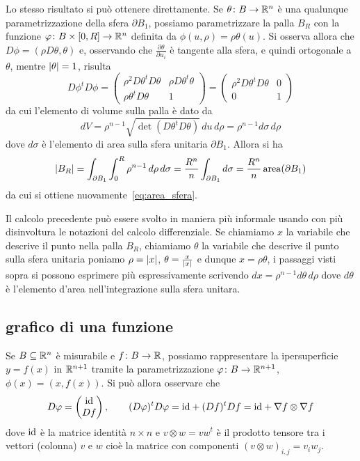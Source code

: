 Lo stesso risultato si può ottenere direttamente. 
Se $\theta\colon B\to {\mathbb R}^n$ è una qualunque parametrizzazione della sfera $\partial B_1$,
possiamo parametrizzare la palla $B_R$ con la funzione $\varphi \colon B\times [0,R] \to {\mathbb R}^n$ 
definita da $\phi(u,\rho) = \rho\theta(u)$.
Si osserva allora che $D\phi = (\rho D\theta, \theta)$ e, 
osservando che $\frac{\partial \theta}{\partial u_i}$ 
è tangente alla sfera, e quindi ortogonale a $\theta$, mentre ${\left|\theta\right|}=1$, 
risulta
\[
  D\phi^t D\phi = \begin{pmatrix}
  \rho^2 D\theta^t D\theta & \rho D\theta^t \theta \\
  \rho \theta^t D\theta & 1
  \end{pmatrix} = \begin{pmatrix}
  \rho^2 D\theta^t D\theta & 0 \\
  0 & 1
  \end{pmatrix}
\]
da cui l'elemento di volume sulla palla è dato da 
\[
  dV = \rho^{n-1} \sqrt{\det(D\theta^t D\theta)}\, du\, d\rho
     = \rho^{n-1} d\sigma\, d\rho
\]
dove $d\sigma$ è l'elemento di area sulla sfera unitaria $\partial B_1$.
Allora si ha
\[
{\left|B_R\right|} 
  = \int_{\partial B_1} \int_0^R \rho^{n-1}\, d\rho\, d\sigma 
  = \frac{R^n}{n} \int_{\partial B_1} d\sigma 
  = \frac{R^n}{n} \operatorname{area}(\partial B_1)
\]
da cui si ottiene nuovamente~\eqref{eq:area_sfera}.

Il calcolo precedente può essere svolto in maniera più 
informale usando con più disinvoltura le notazioni del calcolo 
differenziale. 
Se chiamiamo $x$ la variabile che descrive il punto nella palla $B_R$,
chiamiamo $\theta$ la variabile che descrive il punto sulla sfera unitaria
poniamo $\rho={\left|x\right|}$, $\theta = \frac{x}{{\left|x\right|}}$ e dunque $x = \rho \theta$,
i passaggi visti sopra si possono esprimere più espressivamente 
scrivendo $dx = \rho^{n-1} d\theta \, d\rho$ dove $d\theta$ è 
l'elemento d'area nell'integrazione sulla sfera unitara.

\subsection{grafico di una funzione}

Se $B\subseteq {\mathbb R}^n$ è misurabile e $f\colon B\to {\mathbb R}$, possiamo 
rappresentare la ipersuperficie $y=f(x)$ in ${\mathbb R}^{n+1}$
tramite la parametrizzazione $\varphi\colon B\to {\mathbb R}^{n+1}$, 
$\phi(x) = (x, f(x))$.
Si può allora osservare che 
\[
  D\varphi = \begin{pmatrix}
    \mathrm{id} \\
    Df
  \end{pmatrix},
  \qquad
  (D\varphi)^t D\varphi = \mathrm{id} + (Df)^t Df = \mathrm{id} + \nabla f \otimes \nabla f
\]
dove $\mathrm{id}$ è la matrice identità $n\times n$ e 
$v \otimes w = v w^t$ è il prodotto tensore tra i vettori (colonna) 
$v$ e $w$ cioè la matrice con componenti $(v \otimes w)_{i,j} = v_i w_j$.

